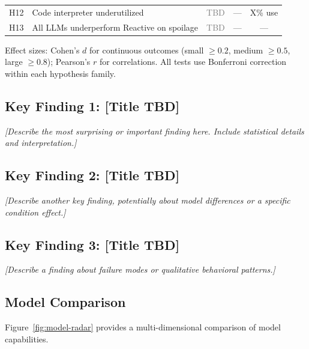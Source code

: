 \begin{table}[h]
\begin{tabular}{@{}cp{6.5cm}ccc@{}}
H12 & Code interpreter underutilized & \textcolor{gray}{TBD} & --- & X\% use \\
H13 & All LLMs underperform Reactive on spoilage & \textcolor{gray}{TBD} & --- & --- \\
\bottomrule
\end{tabular}
\begin{flushleft}
\small Effect sizes: Cohen's $d$ for continuous outcomes (small $\geq 0.2$, medium $\geq 0.5$, large $\geq 0.8$); Pearson's $r$ for correlations. All tests use Bonferroni correction within each hypothesis family.
\end{flushleft}
\end{table}

\subsection{Key Finding 1: [Title TBD]}
\label{sec:finding1}

\emph{[Describe the most surprising or important finding here. Include statistical details and interpretation.]}

\subsection{Key Finding 2: [Title TBD]}
\label{sec:finding2}

\emph{[Describe another key finding, potentially about model differences or a specific condition effect.]}

\subsection{Key Finding 3: [Title TBD]}
\label{sec:finding3}

\emph{[Describe a finding about failure modes or qualitative behavioral patterns.]}

\subsection{Model Comparison}
\label{sec:model-comparison}

Figure~\ref{fig:model-radar} provides a multi-dimensional comparison of model capabilities.

